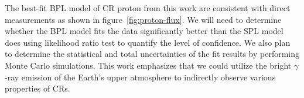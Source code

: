 The best-fit BPL model of CR proton from this work are consistent with direct
measurements as shown in figure~\ref{fig:proton-flux}.
We will need to determine whether the BPL model fits the data significantly better
than the SPL model does using likelihood ratio test to quantify the level of
confidence. We also plan to determine the statistical and total uncertainties of
the fit results by performing Monte Carlo simulations.
This work emphasizes that we could utilize the bright $\gamma$-ray emission
of the Earth's upper atmosphere to indirectly observe various properties of CRs.




